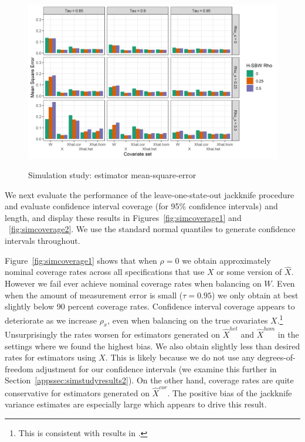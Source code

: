 \begin{figure}[H]
\begin{center}
    \caption{Simulation study: estimator mean-square-error}\label{fig:simmse}
    \label{fig:loveplotc1}
    \includegraphics[scale=0.5]{01_Plots/mse-plot.png}
\end{center}
\end{figure}

We next evaluate the performance of the leave-one-state-out jackknife procedure and evaluate confidence interval coverage (for 95\% confidence intervals) and length, and display these results in Figures~\ref{fig:simcoverage1} and ~\ref{fig:simcoverage2}. We use the standard normal quantiles to generate confidence intervals throughout.

Figure~\ref{fig:simcoverage1} shows that when $\rho = 0$ we obtain approximately nominal coverage rates across all specifications that use $X$ or some version of $\hat{X}$. However we fail ever achieve nominal coverage rates when balancing on $W$. Even when the amount of measurement error is small ($\tau = 0.95$) we only obtain at best slightly below 90 percent coverage rates. Confidence interval coverage appears to deteriorate as we increase $\rho_x$, even when balancing on the true covariates $X$.\footnote{This is consistent with results in \cite{cameron2008bootstrap}.} Unsurprisingly the rates worsen for estimators generated on $\hat{X}^{het}$ and $\hat{X}^{hom}$ in the settings where we found the highest bias. We also obtain slightly less than desired rates for estimators using $X$. This is likely because we do not use any degrees-of-freedom adjustment for our confidence intervals (we examine this further in Section~\ref{appssec:simstudyresults2}). On the other hand, coverage rates are quite conservative for estimators generated on $\hat{X}^{cor}$. The positive bias of the jackknife variance estimates are especially large which appears to drive this result. 

